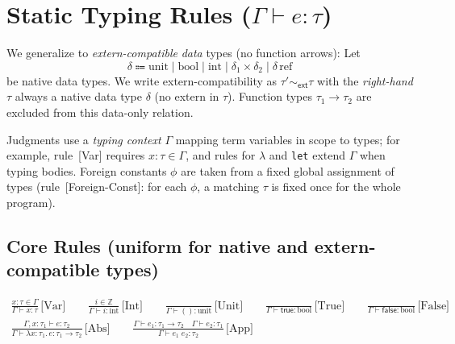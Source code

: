 \documentclass[11pt,a4paper]{article}
\begin{document}
\section{Static Typing Rules ($\Gamma \vdash e : \tau$)}
\label{sec:static}

\medskip
\noindent
\begingroup
\setlength{\fboxsep}{10pt}%
\setlength{\fboxrule}{0.6pt}%
%
\endgroup
\medskip

We generalize to \emph{extern-compatible} \emph{data} types (no function arrows):
Let
\[
    \delta \Coloneqq \text{unit} \mid \text{bool} \mid \text{int} \mid \delta_1 \times \delta_2 \mid \delta\,\text{ref}
\]
be native data types.
We write extern-compatibility as $\tau' \sim_{\textsf{ext}} \tau$ with the \emph{right-hand} $\tau$ always a native data type $\delta$ (no \textsf{extern} in $\tau$).
Function types $\tau_1 \to \tau_2$ are excluded from this data-only relation.

Judgments use a \emph{typing context} $\Gamma$ mapping term variables in scope to types; for example, rule~\textsf{[Var]} requires $x : \tau \in \Gamma$, and rules for $\lambda$ and \texttt{let} extend $\Gamma$ when typing bodies.
Foreign constants $\phi$ are taken from a fixed global assignment of types (rule~\textsf{[Foreign-Const]}: for each $\phi$, a matching $\tau$ is fixed once for the whole program).

\subsection{Core Rules (uniform for native and extern-compatible types)}
\begin{gather*}
  \frac{x : \tau \in \Gamma}{\Gamma \vdash x : \tau}\,\text{[Var]}
  \qquad
  \frac{i \in \mathbb{Z}}{\Gamma \vdash i : \text{int}}\,\text{[Int]}
  \qquad
  \frac{}{\Gamma \vdash () : \text{unit}}\,\text{[Unit]}
  \qquad
  \frac{}{\Gamma \vdash \textsf{true} : \text{bool}}\,\text{[True]}
  \qquad
  \frac{}{\Gamma \vdash \textsf{false} : \text{bool}}\,\text{[False]}
  \\[0.75em]
  \frac{\Gamma, x{:}\tau_1 \vdash e : \tau_2}{\Gamma \vdash \lambda x{:}\tau_1.\, e : \tau_1 \to \tau_2}\,\text{[Abs]}
  \qquad
  \frac{\Gamma \vdash e_1 : \tau_1 \to \tau_2 \quad \Gamma \vdash e_2 : \tau_1}{\Gamma \vdash e_1\; e_2 : \tau_2}\,\text{[App]}
\end{gather*}
\end{document}

